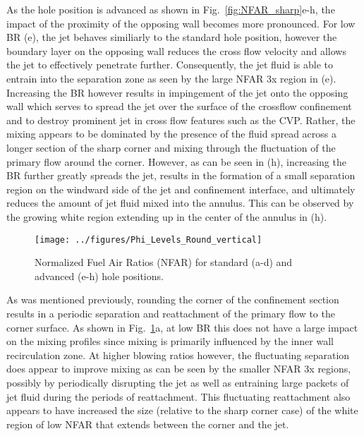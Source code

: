 \documentclass[10pt, twocolumn]{article}
\begin{document}
As the hole position is advanced as shown in Fig.~\ref{fig:NFAR_sharp}e-h, the impact of the proximity of the opposing wall becomes more pronounced. For low BR (e), the jet behaves similiarly to the standard hole position, however the boundary layer on the opposing wall reduces the cross flow velocity and allows the jet to effectively penetrate further. Consequently, the jet fluid is able to entrain into the separation zone as seen by the large NFAR 3x region in (e). Increasing the BR however results in impingement of the jet onto the opposing wall which serves to spread the jet over the surface of the crossflow confinement and to destroy prominent jet in cross flow features such as the CVP. Rather, the mixing appears to be dominated by the presence of the fluid spread across a longer section of the sharp corner and mixing through the fluctuation of the primary flow around the corner. However, as can be seen in (h), increasing the BR further greatly spreads the jet, results in the formation of a small separation region on the windward side of the jet and confinement interface, and ultimately reduces the amount of jet fluid mixed into the annulus. This can be observed by the growing white region extending up in the center of the annulus in (h).

\begin{figure}[t!]
	\centering
	\texttt{[image: ../figures/Phi\_Levels\_Round\_vertical]}
	\caption{Normalized Fuel Air Ratios (NFAR) for standard (a-d) and advanced (e-h) hole positions.}
	\label{fig:NFAR_round}
\end{figure}

As was mentioned previously, rounding the corner of the confinement section results in a periodic separation and reattachment of the primary flow to the corner surface. As shown in Fig.~\ref{fig:NFAR_round}a, at low BR this does not have a large impact on the mixing profiles since mixing is primarily influenced by the inner wall recirculation zone. At higher blowing ratios however, the fluctuating separation does appear to improve mixing as can be seen by the smaller NFAR 3x regions, possibly by periodically disrupting the jet as well as entraining large packets of jet fluid during the periods of reattachment. This fluctuating reattachment also appears to have increased the size (relative to the sharp corner case) of the white region of low NFAR that extends between the corner and the jet.
\end{document}
